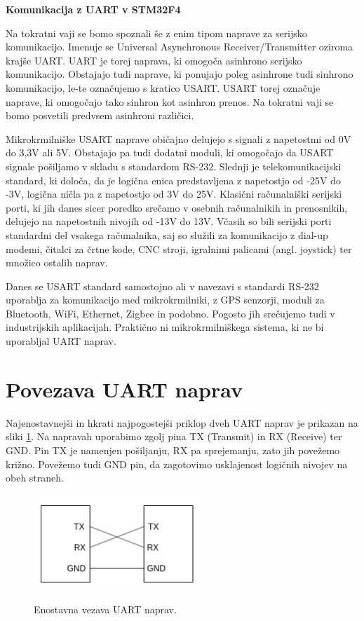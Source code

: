 \documentclass[12pt,letterpaper]{article}
\begin{document}
\begin{center}
    \textbf{\Large Komunikacija z UART v STM32F4}
\end{center}

Na tokratni vaji se bomo spoznali še z enim tipom naprave za serijsko komunikacijo. Imenuje se Universal Asynchronous Receiver/Transmitter oziroma krajše UART. UART je torej naprava, ki omogoča asinhrono serijsko komunikacijo. Obstajajo tudi naprave, ki ponujajo poleg asinhrone tudi sinhrono komunikacijo, le-te označujemo s kratico USART. USART torej označuje naprave, ki omogočajo tako sinhron kot asinhron prenos. Na tokratni vaji se bomo posvetili predvsem asinhroni različici.

Mikrokrmilniške USART naprave običajno delujejo s signali z napetostmi od 0V do 3,3V ali 5V. Obstajajo pa tudi dodatni moduli, ki omogočajo da USART signale pošiljamo v skladu s standardom RS-232. Slednji je telekomunikacijski standard, ki določa, da je logična enica predstavljena z napetostjo od -25V do -3V, logična ničla pa z napetostjo od 3V do 25V. Klasični računalniški serijski porti, ki jih danes sicer poredko srečamo v osebnih računalnikih in prenosnikih, delujejo na napetostnih nivojih od -13V do 13V. Včasih so bili serijski porti standardni del vsakega računalnika, saj so služili za komunikacijo z dial-up modemi, čitalci za črtne kode, CNC stroji, igralnimi palicami (angl. joystick) ter množico ostalih naprav.

Danes se USART standard samostojno ali v navezavi s standardi RS-232 uporablja za komunikacijo med mikrokrmilniki, z GPS senzorji, moduli za Bluetooth, WiFi, Ethernet, Zigbee in podobno. Pogosto jih srečujemo tudi v industrijskih aplikacijah. Praktično ni mikrokrmilniškega sistema, ki ne bi uporabljal UART naprav.


\section*{Povezava UART naprav}

Najenostavnejši in hkrati najpogostejši priklop dveh UART naprav je prikazan na sliki \ref{simpleuart}. Na napravah uporabimo zgolj pina TX (Transmit) in RX (Receive) ter GND. Pin TX je namenjen pošiljanju, RX pa sprejemanju, zato jih povežemo križno. Povežemo tudi GND pin, da zagotovimo usklajenost logičnih nivojev na obeh straneh.

\begin{figure}[ht!]
  \centering
  \caption{Enostavna vezava UART naprav.}
  \includegraphics[width=180pt]{images/vaja8/uart_simple.png}
  \label{simpleuart}
\end{figure}
\end{document}
